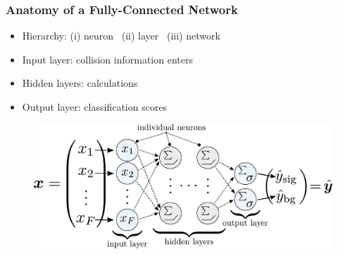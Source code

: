 \documentclass[14pt, t]{beamer}
\begin{document}
\begin{frame}
    \frametitle{Anatomy of a Fully-Connected Network}

    \begin{itemize}
    
        \item<1-> Hierarchy: {\small (i) neuron} \ (ii) layer \ {\large (iii) network}

        \item<2-> Input layer: collision information enters
                  
        \item<3-> Hidden layers: calculations
                  
        \item<4-> Output layer: classification scores
    
    \end{itemize}
    \vspace{-4mm}
    \begin{figure}[htb!]
        \centering
        \includegraphics[width=\linewidth]{vector/fcn-architecture-simple.pdf}
    \end{figure}
\end{frame}
\end{document}
